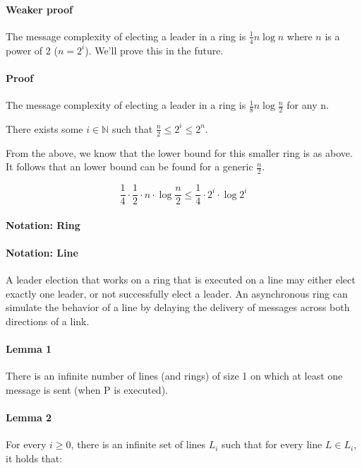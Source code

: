 \documentclass{idc_msc}
\begin{document}
\paragraph{Weaker proof}
The message complexity of electing a leader in a ring is $\frac{1}{4} n \log n$ where $n$ is a power of 2 ($n=2^i$).
We'll prove this in the future.

\paragraph{Proof}
The message complexity of electing a leader in a ring is $\frac{1}{8} n \log \frac{n}{2}$ for any n.

There exists some $i \in \mathbb{N}$ such that $\frac{n}{2} \le 2^i \le 2^n$.

From the above, we know that the lower bound for this smaller ring is as above.
It follows that an lower bound can be found for a generic $\frac{n}{2}$.

\[\frac{1}{4}\cdot\frac{1}{2}\cdot n \cdot \log \frac{n}{2} \le \frac{1}{4}\cdot 2 ^i \cdot \log 2^i\]

\paragraph{Notation: Ring}


\paragraph{Notation: Line}


A leader election that works on a ring that is executed on a line may either elect exactly one leader, or not successfully elect a leader. An asynchronous ring can simulate the behavior of a line by delaying the delivery of messages across both directions of a link.

\paragraph{Lemma 1}
There is an infinite number of lines (and rings) of size 1 on which at least one message is sent (when P is executed).

\paragraph{Lemma 2}
For every $i \ge 0$, there is an infinite set of lines $L_i$ such that for every line $L \in L_i$, it holds that:
\end{document}
